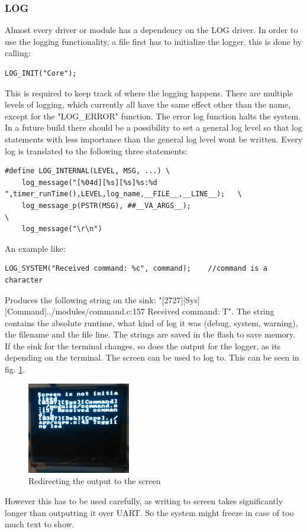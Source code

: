 \subsubsection{LOG}
Almost every driver or module has a dependency on the LOG driver. In order to use the logging functionality, a file first has to initialize the logger. this is done by calling:
\begin{verbatim}
LOG_INIT("Core");
\end{verbatim}
This is required to keep track of where the logging happens. There are multiple levels of logging, which currently all have the same effect other than the name, except for the "LOG\_ERROR" function. The error log function halts the system. In a future build there should be a possibility to set a general log level so that log statements with less importance than the general log level wont be written. Every log is translated to the following three statements:
\begin{verbatim}
#define LOG_INTERNAL(LEVEL, MSG, ...) \
	log_message("[%04d][%s][%s]%s:%d ",timer_runTime(),LEVEL,log_name,__FILE__,__LINE__);   \
	log_message_p(PSTR(MSG), ##__VA_ARGS__);                                                        \
	log_message("\r\n")
\end{verbatim}
An example like:
\begin{verbatim}
LOG_SYSTEM("Received command: %c", command);	//command is a character
\end{verbatim}
Produces the following string on the sink: "[2727][Sys][Command]../modules/command.c:157 Received command: T". The string contains the absolute runtime, what kind of log it was (debug, system, warning), the filename and the file line. The strings are saved in the flash to save memory. If the sink for the terminal changes, so does the output for the logger, as its depending on the terminal. The screen can be used to log to. This can be seen in fig. \ref{fig:screen_logger}.
\begin{figure}[H]
	\centering
	\label{fig:screen_logger}
	\includegraphics[width=0.4\textwidth]{./fig/screen_logger.png}
	\caption{Redirecting the output to the screen}
\end{figure}
However this has to be used carefully, as writing to screen takes significantly longer than outputting it over UART. So the system might freeze in case of too much text to show.
